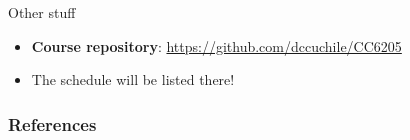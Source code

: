 \documentclass[10pt]{beamer}
\begin{document}
\begin{frame}{Other stuff}
\begin{itemize}
    \item \textbf{Course repository}: \url{https://github.com/dccuchile/CC6205}
    \item The schedule will be listed there!
\end{itemize}    
\end{frame}

\begin{frame}[allowframebreaks]\scriptsize
\frametitle{References}


%
\end{frame}  
\end{document}
